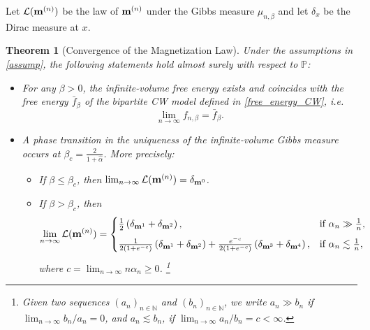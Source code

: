 \documentclass[11pt,oneside]{amsart}
\numberwithin{equation}{section}  %
\theoremstyle{plain}
\newtheorem{theorem}{Theorem}
\theoremstyle{remark}
\def \bm {{\bf m}}
\begin{document}
Let $\mathcal{L}(\bm^{(n)})$ be the law of $\bm^{(n)}$ under the Gibbs measure $\mu_{n,\beta}$ and let $\delta_x$ be the Dirac measure at $x$.

\begin{theorem}[Convergence of the Magnetization Law]
\label{thm_convergence}
Under the assumptions in \eqref{assump}, the following statements hold almost surely with respect to $\mathbb{P}$:
\begin{itemize}
\item[(i)] For any $\beta > 0$, the infinite-volume free energy exists and coincides with the free energy $\bar{f}_\beta$ of the bipartite CW model defined in \eqref{free_energy_CW}, i.e.
\[
\lim_{n \to \infty} f_{n,\beta} = \bar{f}_\beta.
\]

\item[(ii)] A phase transition in the uniqueness of the infinite-volume Gibbs measure occurs at 
$\beta_c = \frac{2}{1+\hat{\alpha}}$.
More precisely:
\begin{itemize}
\item[(a)] If $\beta \le \beta_c$, then
$\lim_{n \to \infty} \mathcal{L}(\bm^{(n)}) = \delta_{\bm^0}$.

\item[(b)] If $\beta > \beta_c$, then
\[
\lim_{n \to \infty} \mathcal{L}(\bm^{(n)}) =
\begin{cases}
\frac{1}{2} \left( \delta_{\bm^1} + \delta_{\bm^2} \right), & \text{if } \alpha_n \gg \frac{1}{n}, \\[6pt]
\frac{1}{2(1+e^{-c})} \left( \delta_{\bm^1} + \delta_{\bm^2} \right)
+ \frac{e^{-c}}{2(1+e^{-c})} \left( \delta_{\bm^3} + \delta_{\bm^4} \right),
& \text{if } \alpha_n \lesssim \frac{1}{n},
\end{cases}
\, 
\]
where $c = \lim_{n \to \infty} n \alpha_n \ge 0$. \footnote{ Given two sequences $(a_n)_{n \in \mathbb{N}}$ and $(b_n)_{n \in \mathbb{N}}$,  we write $a_n \gg b_n$ if $\displaystyle{\lim_{n\to\infty} b_n/a_n=0}$, and $a_n \lesssim b_n$, if $\displaystyle{\lim_{n\to\infty}a_n/b_n=c< \infty}$.}
\end{itemize}
\end{itemize}
\end{theorem}
\end{document}
